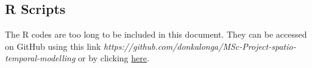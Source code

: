 \begin{appendices}
    \newpage


\section{R Scripts}

The R codes are too long to be included in this document. They can be accessed on GitHub using this link \textit{https://github.com/donkalonga/MSc-Project-spatio-temporal-modelling} or by clicking \href{https://github.com/donkalonga/MSc-Project-spatio-temporal-modelling}{here}.


\end{appendices}
